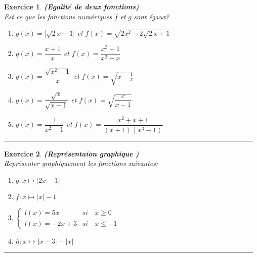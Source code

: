 \documentclass[twocolumn,french]{article}
\theoremstyle{plain}
\newtheorem{exo}{Exercice}%
\begin{document}
\begin{exo} 
\textit{\textbf{ (Egalité de deux fonctions)}}
\\
Est ce que les fonctions numériques $f$ et $g$ sont égaux? 
\\
\begin{enumerate}
\item $g(x)=|\sqrt{2}x-1| $ et  $f(x)=\sqrt{2x^2-2\sqrt{2}x+1} $
\\	
\item $g(x)=\dfrac{x+1}{x} $ et  $f(x)=\dfrac{x^2-1}{x^2-x} $		\\	
\item $g(x)=\dfrac{\sqrt{x^2-1}}{x} $ et  $f(x)= \sqrt{x-\frac{1}{x}}$		
\\	
\item $g(x)=\dfrac{\sqrt{x}}{\sqrt{x-1}} $ et  $f(x)= \sqrt{\dfrac{x}{x-1}}$	
\\		
\item $g(x)=\dfrac{1}{x^2-1} $ et  $f(x)= \dfrac{x^2+x+1}{(x+1)(x^3-1)}$			
\\		
\end{enumerate}


\end{exo}
\hrule



\begin{exo}
\textbf{\textit{ (Représentaion graphique )}}\\
Représenter graphiquement les fonctions suivantes:
\\
\begin{enumerate}
\item $g:x\longmapsto |2x-1| $
\\
\item $f:x\longmapsto |x|-1$
\\
\item $
	\left\lbrace
	\begin{array}{ll}
	l(x)=5x &si\quad x\geqslant 0\\
	l(x)=-2x+3 &si\quad x\leqslant -1
	
	\end{array}
	\right.
$
\\
\item $h:x\longmapsto |x-3|-|x|$
\\
\end{enumerate}


\end{exo}
\hrule
\end{document}
